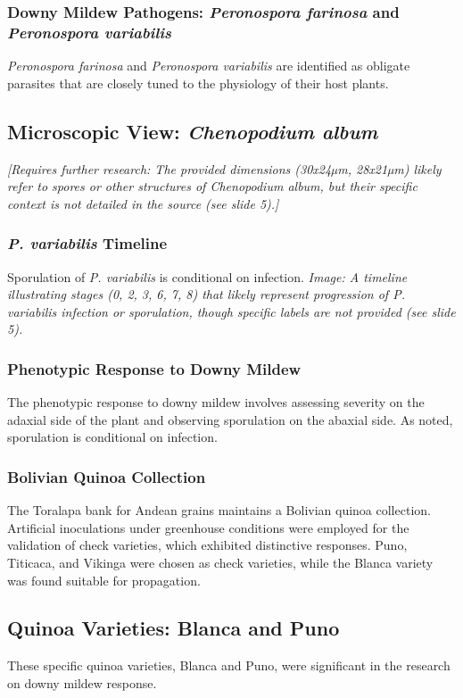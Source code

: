 \subsubsection{Downy Mildew Pathogens: \textit{Peronospora farinosa} and \textit{Peronospora variabilis}} 
\textit{Peronospora farinosa} and \textit{Peronospora variabilis} are identified as obligate parasites that are closely tuned to the physiology of their host plants.

\subsection{Microscopic View: \textit{Chenopodium album}} 
\textit{[Requires further research: The provided dimensions (30x24µm, 28x21µm) likely refer to spores or other structures of \textit{Chenopodium album}, but their specific context is not detailed in the source (see slide 5).]}

\subsubsection{\textit{P. variabilis} Timeline} 
Sporulation of \textit{P. variabilis} is conditional on infection. \textit{Image: A timeline illustrating stages (0, 2, 3, 6, 7, 8) that likely represent progression of \textit{P. variabilis} infection or sporulation, though specific labels are not provided (see slide 5).}

\subsubsection{Phenotypic Response to Downy Mildew} 
The phenotypic response to downy mildew involves assessing severity on the adaxial side of the plant and observing sporulation on the abaxial side. As noted, sporulation is conditional on infection.

\subsubsection{Bolivian Quinoa Collection} 
The Toralapa bank for Andean grains maintains a Bolivian quinoa collection. Artificial inoculations under greenhouse conditions were employed for the validation of check varieties, which exhibited distinctive responses. Puno, Titicaca, and Vikinga were chosen as check varieties, while the Blanca variety was found suitable for propagation.

\subsection{Quinoa Varieties: Blanca and Puno} 
These specific quinoa varieties, Blanca and Puno, were significant in the research on downy mildew response.

